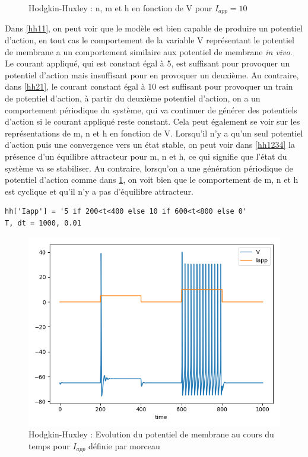 \documentclass[12pt]{scrartcl}
\begin{document}
\begin{figure}[!h]
\begin{minipage}[l]{.3\linewidth}
\end{minipage}\hfill
\caption{Hodgkin-Huxley : n, m et h en fonction de V pour $I_{app} = 10$}
\label{hh2234}
\end{figure}

Dans \ref{hh11}, on peut voir que le modèle est bien capable de produire un potentiel d'action, en tout cas le comportement de la variable V représentant le potentiel de membrane a un comportement similaire aux potentiel de membrane \textit{in vivo}. Le courant appliqué, qui est constant égal à 5, est suffisant pour provoquer un potentiel d'action mais insuffisant pour en provoquer un deuxième. Au contraire, dans \ref{hh21}, le courant constant égal à 10 est suffisant pour provoquer un train de potentiel d'action, à partir du deuxième potentiel d'action, on a un comportement périodique du système, qui va continuer de générer des potentiels d'action si le courant appliqué reste constant. Cela peut également se voir sur les représentations de m, n et h en fonction de V. Lorsqu'il n'y a qu'un seul potentiel d'action puis une convergence vers un état stable, on peut voir dans \ref{hh1234} la présence d'un équilibre attracteur pour m, n et h, ce qui signifie que l'état du système va se stabiliser. Au contraire, lorsqu'on a une génération périodique de potentiel d'action comme dans \ref{hh2234}, on voit bien que le comportement de m, n et h est cyclique et qu'il n'y a pas d'équilibre attracteur.

\begin{lstlisting}[caption = {Hodgkin-Huxley : Simulation du modèle pour $I_{app}$ définie par morceau}]
hh['Iapp'] = '5 if 200<t<400 else 10 if 600<t<800 else 0'
T, dt = 1000, 0.01
\end{lstlisting}

\begin{figure}[!h]
\centering
\includegraphics[scale=0.8]{imgs/hh31.png}
\caption{Hodgkin-Huxley : Evolution du potentiel de membrane au cours du temps pour $I_{app}$ définie par morceau}
\label{hh31}
\end{figure}
\end{document}
